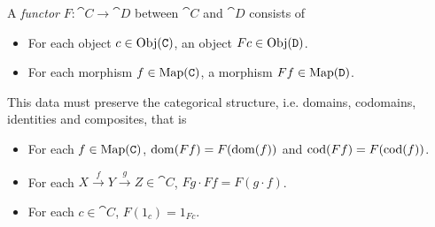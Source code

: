


\begin{dfn*}[Functor]
	A \emph{functor} $F: \cat{C}\rightarrow\cat{D}$ between
	 $\cat{C}$ and $\cat{D}$ consists of
	\begin{itemize}
		\item For each object $c\in\text{Obj}({\normalfont\texttt{C}})$, an object $Fc\in\text{Obj}({\normalfont\texttt{D}})$.
		\item For each morphism $f\in\text{Map}({\normalfont\texttt{C}})$, a morphism $Ff\in\text{Map}({\normalfont\texttt{D}})$.
	\end{itemize}

	This data must preserve the categorical structure, i.e. domains, codomains,
	identities and composites, that is

	\begin{itemize}
		\item For each $f\in\text{Map}({\normalfont\texttt{C}})$, $\operatorname{dom}(Ff) = F(\operatorname{dom}(f))$ and $\operatorname{cod}(Ff) =
			      F(\operatorname{cod}(f))$.
		\item For each $X\xrightarrow{f}Y\xrightarrow{g}Z\in \cat{C}$, $Fg\cdot Ff =
			      F(g\cdot f)$.
		\item For each $c\in\cat{C}$, $F(1_c) = 1_{Fc}$.
	\end{itemize}

\end{dfn*}



